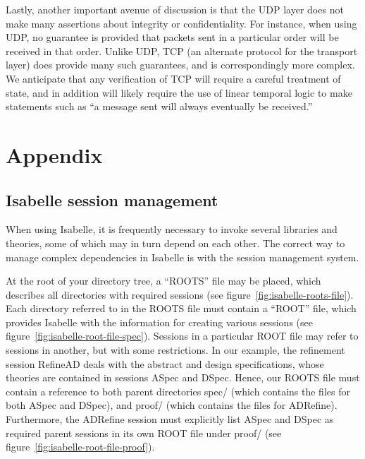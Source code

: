 \documentclass[twoside]{memoir}
\begin{document}
Lastly, another important avenue of discussion is that the UDP layer does not make many assertions about integrity or confidentiality.
For instance, when using UDP, no guarantee is provided that packets sent in a particular order
will be received in that order.
Unlike UDP, TCP (an alternate protocol for the transport layer) does provide many such guarantees,
and is correspondingly more complex. We anticipate that any verification of TCP will require
a careful treatment of state, and in addition will likely require the use of linear temporal logic
to make statements such as ``a message sent will always eventually be received.''





\appendix
\chapter{Appendix}
\section{Isabelle session management}
When using Isabelle, it is frequently necessary to invoke several libraries and theories,
some of which may in turn depend on each other.
The correct way to manage complex dependencies in Isabelle is with the session management system.

At the root of your directory tree, a ``ROOTS'' file may be placed, which describes all directories with required sessions (see figure~\ref{fig:isabelle-roots-file}).
Each directory referred to in the ROOTS file must contain a ``ROOT'' file, which provides Isabelle with the information for creating various sessions
(see figure~\ref{fig:isabelle-root-file-spec}).
Sessions in a particular ROOT file may refer to sessions in another, but with some restrictions.
In our example, the refinement session RefineAD deals with the abstract and design specifications, whose theories are contained in sessions
ASpec and DSpec.
Hence, our ROOTS file must contain a reference to both parent directories spec/ (which contains the files for both ASpec and DSpec), and proof/
(which contains the files for ADRefine).
Furthermore, the ADRefine session must explicitly list ASpec and DSpec as required parent sessions in its own ROOT file under proof/ (see figure~\ref{fig:isabelle-root-file-proof}).
\end{document}
